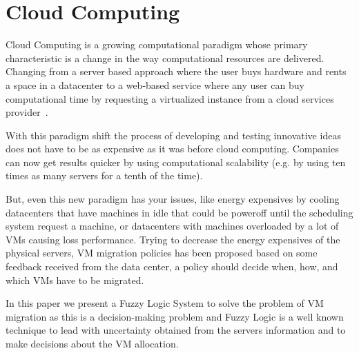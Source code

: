 \documentclass[runningheads,a4paper]{llncs}
\begin{document}






\section{Cloud Computing} \label{sec:CloudComputing} Cloud Computing is a growing computational paradigm whose primary characteristic is a change in the way computational resources are delivered. Changing from a server based approach where the user buys hardware and rents a space in a datacenter to a web-based service where any user can buy computational time by requesting a virtualized instance from a cloud services provider~\cite{NIST:2011}. 

With this paradigm shift the process of developing and testing innovative ideas does not have to be as expensive as it was before cloud computing. Companies can now get results quicker by using computational scalability (e.g. by using ten times as many servers for a tenth of the time). 

But, even this new paradigm has your issues, like energy expensives by cooling datacenters that have machines in idle that could be poweroff until the scheduling system request a machine, or datacenters with machines overloaded by a lot of VMs causing loss performance.
Trying to decrease the energy expensives of the physical servers, VM migration policies has been proposed based on some feedback received from the data center, a policy should decide when, how, and which VMs have to be migrated. 

In this paper we present a Fuzzy Logic System to solve the problem of VM migration as this is a decision-making problem and Fuzzy Logic is a well known technique to lead with uncertainty obtained from the servers information and to make decisions about the VM allocation.
\end{document}
